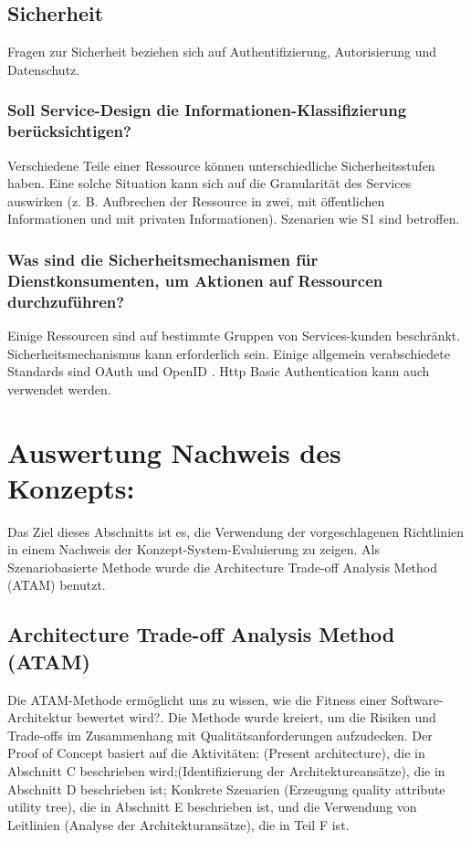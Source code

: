 \documentclass{acmsiggraph}
\begin{document}
\subsection{Sicherheit}
Fragen zur Sicherheit beziehen sich auf Authentifizierung, Autorisierung und Datenschutz.
\subsubsection{Soll Service-Design die Informationen-Klassifizierung berücksichtigen?}
Verschiedene Teile einer Ressource können unterschiedliche Sicherheitsstufen haben.
Eine solche Situation kann sich auf die Granularität des Services auswirken (z. B. Aufbrechen der Ressource in zwei, mit öffentlichen Informationen und mit privaten Informationen). Szenarien wie S1 sind betroffen.
\subsubsection{Was sind die Sicherheitsmechanismen für Dienstkonsumenten, um Aktionen auf Ressourcen durchzuführen?}
Einige Ressourcen sind auf bestimmte Gruppen von Services-kunden beschränkt.
Sicherheitsmechanismus kann erforderlich sein. Einige allgemein verabschiedete Standards sind OAuth \cite{OAuth} und OpenID \cite{OpenID}. Http Basic Authentication kann auch verwendet werden.

\section{Auswertung Nachweis des Konzepts:}
Das Ziel dieses Abschnitts ist es, die Verwendung der vorgeschlagenen Richtlinien in einem Nachweis der Konzept-System-Evaluierung zu zeigen.
Als Szenariobasierte Methode wurde die Architecture Trade-off Analysis Method (ATAM) \cite{ATAM} benutzt.
\subsection{Architecture Trade-off Analysis Method (ATAM)}
Die ATAM-Methode ermöglicht uns zu wissen, wie die Fitness einer Software-Architektur bewertet wird?.
Die Methode wurde kreiert, um die Risiken und Trade-offs im Zusammenhang mit Qualitätsanforderungen aufzudecken.
Der Proof of Concept basiert auf die Aktivitäten: (Present architecture), die in Abschnitt C beschrieben wird;(Identifizierung der Architektureansätze), die in Abschnitt D beschrieben ist; Konkrete Szenarien (Erzeugung quality attribute utility tree), die in Abschnitt E beschrieben ist, und die Verwendung von Leitlinien (Analyse der Architekturansätze), die in Teil F ist.
\end{document}
